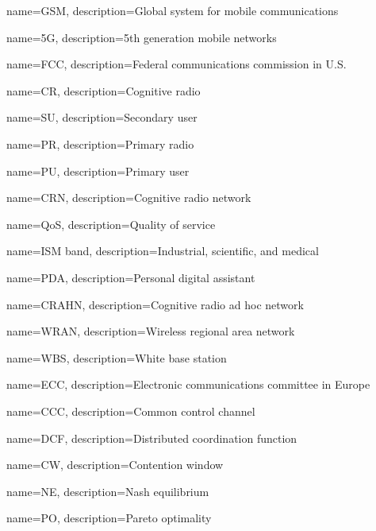 {
    name=GSM,
    description={Global system for mobile communications}
}
 
 
 
{
    name=5G,
    description={5th generation mobile networks}
}
 
 
 
 
 


{
    name=FCC,
    description={Federal communications commission in U.S.}
}
 
 
{
    name=CR,
    description={Cognitive radio}
}

{
    name=SU,
    description={Secondary user}
}
 
{
    name=PR,
    description={Primary radio}
} 
 
{
    name=PU,
    description={Primary user}
}

 
{
    name=CRN,
    description={Cognitive radio network}
}
 
 
{
    name=QoS,
    description={Quality of service}
}


{
    name=ISM band,
    description={Industrial, scientific, and medical}
}

{
    name=PDA,
    description={Personal digital assistant}
}


{
    name=CRAHN,
    description={Cognitive radio ad hoc network}
}


{
    name=WRAN,
    description={Wireless regional area network}
}


{
    name=WBS,
    description={White base station}
}


{
    name=ECC,
    description={Electronic communications committee in Europe}
}


{
    name=CCC,
    description={Common control channel}
}


{
    name=DCF,
    description={Distributed coordination function}
}


{
    name=CW,
    description={Contention window}
}


{
    name=NE,
    description={Nash equilibrium}
}

{
    name=PO,
    description={Pareto optimality}
}


